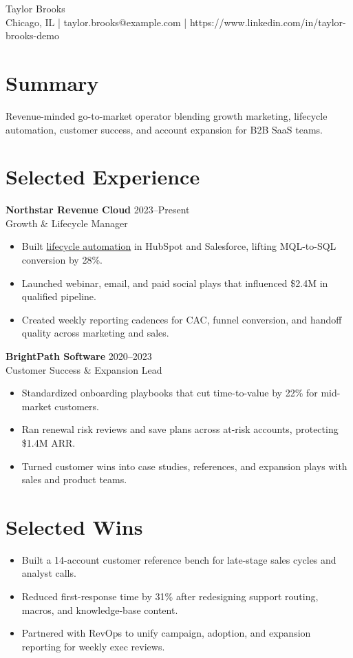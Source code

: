 \documentclass[10pt]{article}
\begin{document}
\begin{center}
  {\LARGE Taylor Brooks}\\
  Chicago, IL \quad | \quad taylor.brooks@example.com \quad | \quad
  https://www.linkedin.com/in/taylor-brooks-demo
\end{center}

\section*{Summary}
Revenue-minded go-to-market operator blending growth marketing, lifecycle automation,
customer success, and account expansion for B2B SaaS teams.

\section*{Selected Experience}
\textbf{Northstar Revenue Cloud} \hfill 2023--Present\\
Growth \& Lifecycle Manager
\begin{itemize}
  \item Built \underline{lifecycle automation} in HubSpot and Salesforce, lifting MQL-to-SQL conversion by 28\%.
  \item Launched webinar, email, and paid social plays that influenced \$2.4M in qualified pipeline.
  \item Created weekly reporting cadences for CAC, funnel conversion, and handoff quality across marketing and sales.
\end{itemize}

\textbf{BrightPath Software} \hfill 2020--2023\\
Customer Success \& Expansion Lead
\begin{itemize}
  \item Standardized onboarding playbooks that cut time-to-value by 22\% for mid-market customers.
  \item Ran renewal risk reviews and save plans across at-risk accounts, protecting \$1.4M ARR.
  \item Turned customer wins into case studies, references, and expansion plays with sales and product teams.
\end{itemize}

\section*{Selected Wins}
\begin{itemize}
  \item Built a 14-account customer reference bench for late-stage sales cycles and analyst calls.
  \item Reduced first-response time by 31\% after redesigning support routing, macros, and knowledge-base content.
  \item Partnered with RevOps to unify campaign, adoption, and expansion reporting for weekly exec reviews.
\end{itemize}
\end{document}
